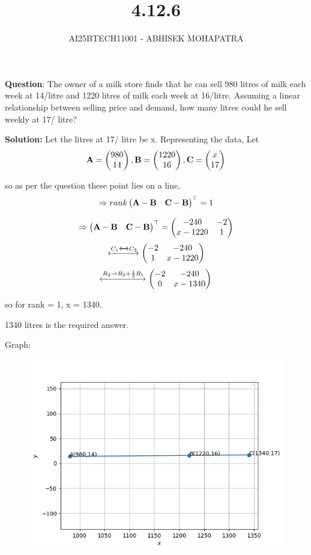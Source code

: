 \documentclass{beamer}
\title{4.12.6}
\author{AI25BTECH11001 - ABHISEK MOHAPATRA}
\numberwithin{equation}{section}
\begin{document}
{\let\newpage\relax\maketitle}
\renewcommand{\thefigure}{\theenumi}
\renewcommand{\thetable}{\theenumi}


	 	\textbf{Question}:
The owner of a milk store finds that he can sell 980 litres of milk each week
at 14/litre and 1220 litres of milk each week at 16/litre. Assuming a linear
relationship between selling price and demand, how many litres could he sell weekly
at 17/ litre?

		\textbf{Solution:} 
Let the litres at 17/ litre be x.
Representing the data, Let
\begin{align}
\mathbf{A} = \begin{pmatrix}980 \\ 14\end{pmatrix},
\mathbf{B} = \begin{pmatrix}1220 \\ 16\end{pmatrix},
\mathbf{C} = \begin{pmatrix}x \\ 17\end{pmatrix}
\end{align}

so as per the question these point lies on a line,
\begin{align}
	\Rightarrow rank\begin{pmatrix}\mathbf{A}-\mathbf{B} & \mathbf{C}-\mathbf{B}\end{pmatrix}^\top = 1 
\end{align}

\begin{align}
	\Rightarrow \begin{pmatrix}\mathbf{A}-\mathbf{B} & \mathbf{C}-\mathbf{B}\end{pmatrix}^\top = \begin{pmatrix}-240 & -2 \\ x-1220 & 1\end{pmatrix} 
\end{align}
\begin{align}
	\xleftrightarrow[]{C_1\xleftrightarrow[]{} C_2} \begin{pmatrix}-2 & -240 \\ 1 & x - 1220\end{pmatrix}
\end{align}
\begin{align}
	\xleftrightarrow[]{R_2\rightarrow R_2 + \frac{1}{2}R_1} \begin{pmatrix}-2 & -240 \\ 0 & x - 1340\end{pmatrix}
\end{align}

so for rank = 1, x = 1340.

1340 litres is the required answer.


Graph:
\begin{figure}[h!]
	\centering
	\includegraphics[width=0.7\linewidth]{fig1.png}
\end{figure}
\end{document}
